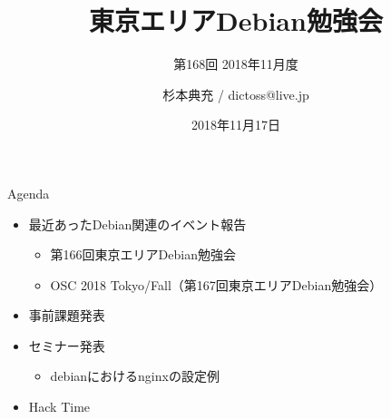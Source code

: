 \title{東京エリアDebian勉強会}
\subtitle{第168回 2018年11月度}
\author{杉本典充 / dictoss@live.jp}
\date{2018年11月17日}



\begin{frame}
\titlepage{}
\end{frame}

\begin{frame}{Agenda}
 \begin{minipage}[t]{0.45\hsize}
  \begin{itemize}
  \item 最近あったDebian関連のイベント報告
    \begin{itemize}
    \item 第166回東京エリアDebian勉強会
    \item OSC 2018 Tokyo/Fall（第167回東京エリアDebian勉強会）
    \end{itemize}
  \item 事前課題発表
  \end{itemize}
 \end{minipage}
 \begin{minipage}[t]{0.45\hsize}
  \begin{itemize}
  \item セミナー発表
    \begin{itemize}
    \item debianにおけるnginxの設定例
    \end{itemize}
  \item Hack Time
  \end{itemize}
 \end{minipage}
\end{frame}

